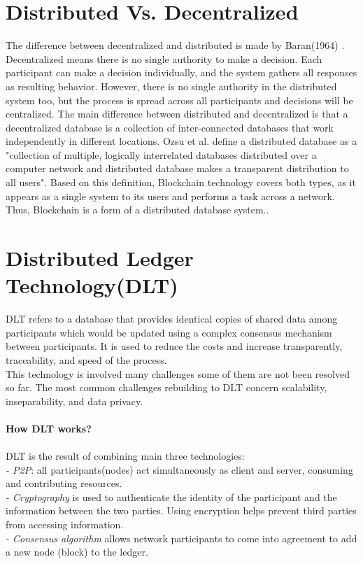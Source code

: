 \section{Distributed Vs. Decentralized } 
The difference between decentralized and distributed is made by Baran(1964) \cite{Baran}. Decentralized means there is no single authority to make a decision. Each participant can make a decision individually, and the system gathers all responses as resulting behavior. However, there is no single authority in the distributed system too, but the process is spread across all participants and decisions will be centralized. The main difference between distributed and decentralized is that a decentralized database is a collection of inter-connected databases that work independently in different locations. Ozsu et al.\cite{Ozsu} define a distributed database as a "collection of multiple, logically interrelated databases distributed over a computer network and distributed database makes a transparent distribution to all users"\cite{Ozsu}. Based on this definition, Blockchain technology covers both types, as it appears as a single system to its users and performs a task across a network. Thus, Blockchain is a form of a distributed database system.\cite{Markos}.


\section{Distributed Ledger Technology(DLT)} 
DLT refers to a database that provides identical copies of shared data among participants which would be updated using a complex consensus mechanism between participants. It is used to reduce the costs and increase transparently, traceability, and speed of the process.\\
This technology is involved many challenges some of them are not been resolved so far. The most common challenges rebuilding to DLT concern scalability, inseparability, and data privacy\cite{Ugarte}. \\
\\
\textbf{How DLT works? }\\
\\
DLT is the result of combining main three technologies:\\
\hspace{1cm}\textit{-  P2P}: all participants(nodes) act simultaneously as client and server, consuming and contributing resources.\\
\hspace{1cm}\textit{- Cryptography} is used to authenticate the identity of the participant and the information between the two parties. Using encryption helps prevent third parties from accessing information. \\
\hspace{1cm}\textit{- Consensus algorithm} allows network participants to come into agreement to add a new node (block) to the ledger\cite{Ugarte}.\\
